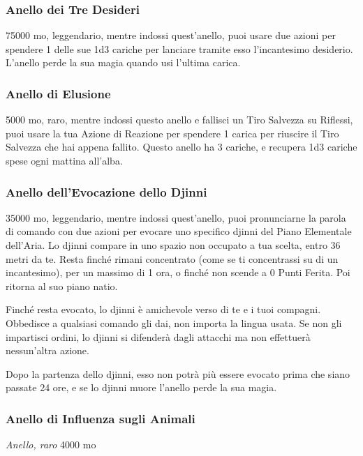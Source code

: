 \begin{multicols}{2}
	\subsubsection*{Anello dei Tre Desideri}
	75000 mo, leggendario, mentre indossi quest'anello, puoi usare due azioni per spendere 1 delle sue 1d3 cariche per lanciare tramite esso l'incantesimo desiderio. L'anello perde la sua magia quando usi l'ultima carica.

	\subsubsection*{Anello di Elusione}
	5000 mo, raro, mentre indossi questo anello e fallisci un Tiro Salvezza su Riflessi, puoi usare la tua Azione di Reazione per spendere 1 carica per riuscire il Tiro Salvezza che hai appena fallito. Questo anello ha 3 cariche, e recupera 1d3 cariche spese ogni mattina all'alba.

	\subsubsection*{Anello dell'Evocazione dello Djinni}
	35000 mo, leggendario, mentre indossi quest'anello, puoi pronunciarne la parola di comando con due azioni per evocare uno specifico djinni del Piano Elementale dell'Aria. Lo djinni compare in uno spazio non occupato a tua scelta, entro 36 metri da te. Resta finché rimani concentrato (come se ti concentrassi su di un incantesimo), per un massimo di 1 ora, o finché non scende a 0 Punti Ferita. Poi ritorna al suo piano natio.

	Finché resta evocato, lo djinni è amichevole verso di te e i tuoi compagni. Obbedisce a qualsiasi comando gli dai, non importa la lingua usata. Se non gli impartisci ordini, lo djinni si difenderà dagli attacchi ma non effettuerà nessun'altra azione.

	Dopo la partenza dello djinni, esso non potrà più essere evocato prima che siano passate 24 ore, e se lo djinni muore l'anello perde la sua magia.

	\subsubsection*{Anello di Influenza sugli Animali} \textit{Anello, raro} 4000 mo


\end{multicols}
